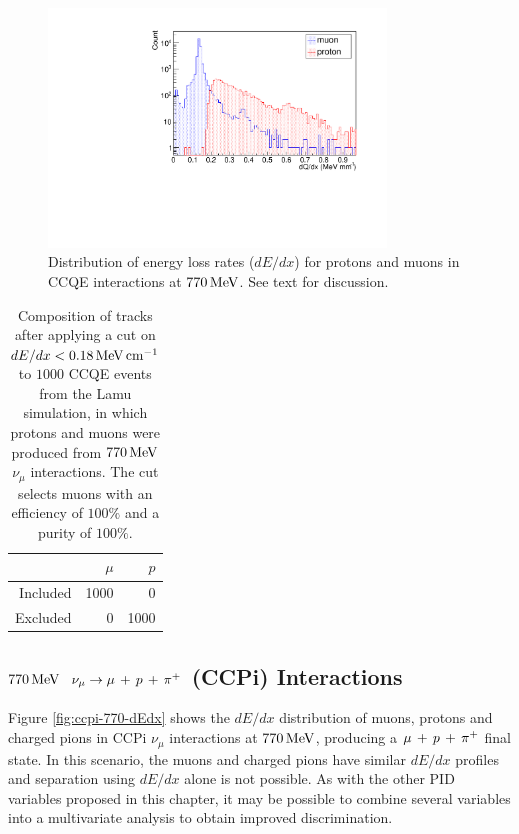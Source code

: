 \begin{figure}
    \centering
    \includegraphics[angle=-90,width=0.8\textwidth]{chapters/particleid_images/ccqe-770-dQdx}
    \caption[$dE/dx$ distribution for protons and muons from $770\MeV$ $\nu_\mu$]{\label{fig:ccqe-770-dEdx}Distribution of energy loss rates ($dE/dx$) for protons and muons in \acs{CCQE} interactions at $770\MeV$. See text for discussion.}
\end{figure}

\begin{table}
    \centering
    \begin{tabular}{*{3}{r}}
        & $\mu$ & $p$ \\
        \hline
        \hline
        Included & 1000 & 0 \\
        Excluded & 0 & 1000 \\
        \hline
    \end{tabular}
    \caption[Composition of tracks after cut on $dE/dx$ for $770\MeV$ \acs{CCQE} events]{\label{table:ccqe-770-dedx-cut}Composition of tracks after applying a cut on $dE/dx < 0.18 \,\mathrm{MeV}\,\mathrm{cm}^{-1}$ to $1000$ \acs{CCQE} events from the Lamu simulation, in which protons and muons were produced from $770\MeV$ $\nu_\mu$ interactions. The cut selects muons with an efficiency of $100\%$ and a purity of $100\%$.}
\end{table}

\subsection{$770\MeV$ $\nu_\mu \rightarrow \mu\,+\,p\,+\,\pi^{+}$ (\acs{CCPi}) Interactions}
Figure \ref{fig:ccpi-770-dEdx} shows the $dE/dx$ distribution of muons, protons and charged pions in \acs{CCPi} $\nu_\mu$ interactions at $770\MeV$, producing a $\mu\,+\,p\,+\,\pi^{+}$ final state. In this scenario, the muons and charged pions have similar $dE/dx$ profiles and separation using $dE/dx$ alone is not possible. As with the other PID variables proposed in this chapter, it may be possible to combine several variables into a multivariate analysis to obtain improved discrimination.

